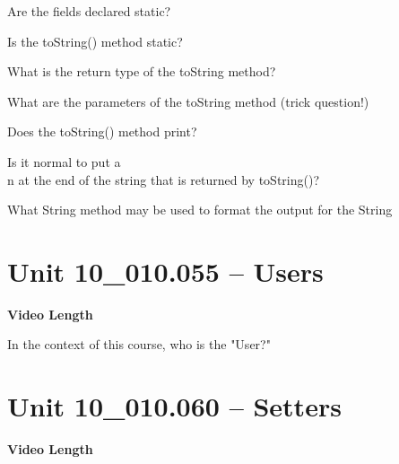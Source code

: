 \documentclass[letterpaper,12pt]{exam}
\newcommand{\unit}{Unit 10}
\begin{document}
\begin{questions}
\begin{samepage}
    \vspace{5mm}
\end{samepage}

\begin{samepage}
    \question Are the fields declared static?
    \vspace{5mm}
\end{samepage}

\begin{samepage}
    \question Is the toString() method static?
    \vspace{5mm}
\end{samepage}
\begin{samepage}
    \question What is the return type of the toString method?
    \vspace{5mm}
\end{samepage}
\begin{samepage}
    \question What are the parameters of the toString method (trick question!)
    \vspace{5mm}
\end{samepage}
\begin{samepage}
    \question Does the toString() method print?
    \vspace{5mm}
\end{samepage}
\begin{samepage}
    \question Is it normal to put a \\n at the end of the string that is returned by toString()?
    \vspace{5mm}
\end{samepage}
\begin{samepage}
    \question What String method may be used to format the output for the String
    \vspace{5mm}
\end{samepage}


\section*{\unit\_010.055 -- Users} 
\par{\selectfont\textbf{Video Length }}

\begin{samepage}
    \question In the context of this course, who is the "User?"
    \vspace{5mm}
\end{samepage}

\section*{\unit\_010.060 -- Setters} 
\par{\selectfont\textbf{Video Length }}


\end{questions}
\end{document}
